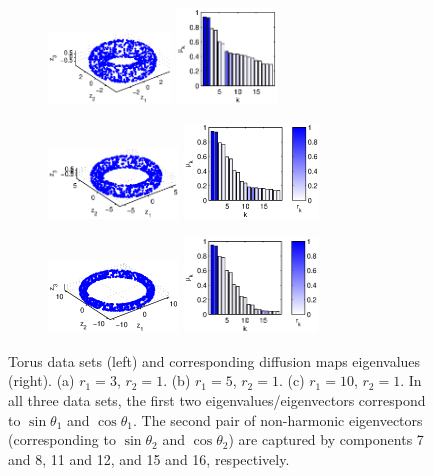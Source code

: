 \documentclass[preprint]{elsarticle}
\begin{document}
\begin{figure}[t]
%
\begin{subfigure}{0.3\textwidth}
\centering
\includegraphics[height=0.75in]{torus1}
\includegraphics[height=1in]{torus1_evals}
\caption{}
\end{subfigure}
%
\hfill
%
\begin{subfigure}{0.32\textwidth}
\centering
\includegraphics[height=0.75in]{torus2}
\includegraphics[height=1in]{torus2_evals}
\caption{}
\end{subfigure}
%
\hfill
%
\begin{subfigure}{0.35\textwidth}
\centering
\includegraphics[height=0.75in]{torus3}
\includegraphics[height=1in]{torus3_evals}
\caption{}
\end{subfigure}
%
\hfill
%
\caption{Torus data sets (left) and corresponding diffusion maps eigenvalues (right). (a) $r_1 = 3$, $r_2 = 1$. (b) $r_1 = 5$, $r_2 = 1$. (c) $r_1 = 10$, $r_2 = 1$. In all three data sets, the first two eigenvalues/eigenvectors correspond to $\sin \theta_1$ and $\cos \theta_1$. The second pair of non-harmonic eigenvectors (corresponding to $\sin \theta_2$ and $\cos \theta_2$) are captured by components 7 and 8, 11 and 12, and 15 and 16, respectively.}
%
\label{fig:torus}
%
\end{figure}
\end{document}
